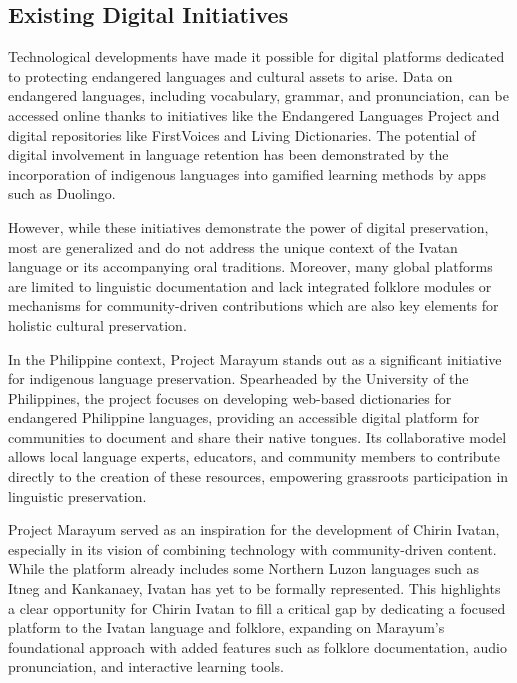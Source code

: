                 \subsection {Existing Digital Initiatives}
                Technological developments have made it possible for digital platforms dedicated to protecting endangered languages and cultural assets to arise. Data on endangered languages, including vocabulary, grammar, and pronunciation, can be accessed online thanks to initiatives like the Endangered Languages Project and digital repositories like FirstVoices and Living Dictionaries. The potential of digital involvement in language retention has been demonstrated by the incorporation of indigenous languages into gamified learning methods by apps such as Duolingo.

                However, while these initiatives demonstrate the power of digital preservation, most are generalized and do not address the unique context of the Ivatan language or its accompanying oral traditions. Moreover, many global platforms are limited to linguistic documentation and lack integrated folklore modules or mechanisms for community-driven contributions which are also key elements for holistic cultural preservation.

                In the Philippine context, Project Marayum stands out as a significant initiative for indigenous language preservation. Spearheaded by the University of the Philippines, the project focuses on developing web-based dictionaries for endangered Philippine languages, providing an accessible digital platform for communities to document and share their native tongues. Its collaborative model allows local language experts, educators, and community members to contribute directly to the creation of these resources, empowering grassroots participation in linguistic preservation.

                Project Marayum served as an inspiration for the development of Chirin Ivatan, especially in its vision of combining technology with community-driven content. While the platform already includes some Northern Luzon languages such as Itneg and Kankanaey, Ivatan has yet to be formally represented. This highlights a clear opportunity for Chirin Ivatan to fill a critical gap by dedicating a focused platform to the Ivatan language and folklore, expanding on Marayum’s foundational approach with added features such as folklore documentation, audio pronunciation, and interactive learning tools.

